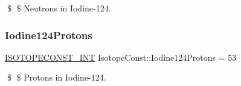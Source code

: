 \$ \$ Neutrons in Iodine-\/124. \mbox{\label{group___isotope_const-_iodine-_i124_ga76159cffb209b40bb4e29b3147ce30fa}} 
\subsubsection{\texorpdfstring{Iodine124\+Protons}{Iodine124Protons}}
{\footnotesize\ttfamily \mbox{\hyperlink{group___isotope_const-_macros_ga5f18360b3e99483a35c32d789e62621c}{I\+S\+O\+T\+O\+P\+E\+C\+O\+N\+S\+T\+\_\+\+I\+NT}} Isotope\+Const\+::\+Iodine124\+Protons = 53}

\$ \$ Protons in Iodine-\/124. 